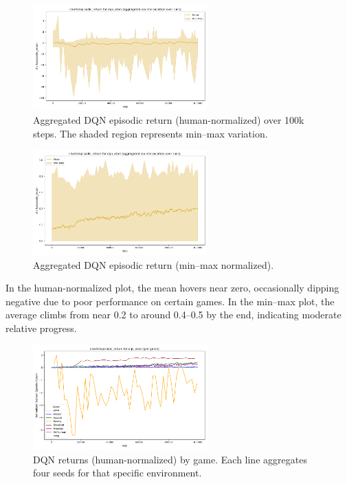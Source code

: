 \begin{figure}
	\centering
	\includegraphics[width=0.6\textwidth]{figures/dqn/charts_episodic_return_human_dqn_atari.png}
	\caption{Aggregated DQN episodic return (human-normalized) 
		over 100k steps. The shaded region represents min--max variation.}
	\label{fig:dqn_return_human}
\end{figure}

\begin{figure}
	\centering
	\includegraphics[width=0.6\textwidth]{figures/dqn/charts_episodic_return_minmax_dqn_atari.png}
	\caption{Aggregated DQN episodic return (min--max normalized).}
	\label{fig:dqn_return_minmax}
\end{figure}

In the human-normalized plot, the mean hovers near zero, 
occasionally dipping negative due to poor performance on certain games. 
In the min--max plot, the average climbs from near 0.2 to around 0.4--0.5 by the end, 
indicating moderate relative progress.

\begin{figure}
	\centering
	\includegraphics[width=0.6\textwidth]{figures/dqn/charts_episodic_return_per_game_human_dqn_atari.png}
	\caption{DQN returns (human-normalized) by game. Each line aggregates 
		four seeds for that specific environment.}
	\label{fig:dqn_return_pergame_human}
\end{figure}

